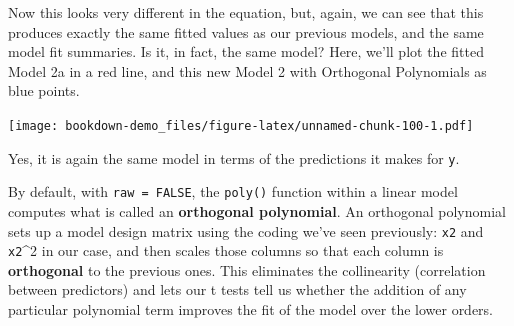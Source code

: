 \documentclass[]{book}
\newenvironment{Shaded}{\begin{snugshade}}{\end{snugshade}}
\newcommand{\KeywordTok}[1]{\textcolor[rgb]{0.13,0.29,0.53}{\textbf{#1}}}
\newcommand{\DataTypeTok}[1]{\textcolor[rgb]{0.13,0.29,0.53}{#1}}
\newcommand{\StringTok}[1]{\textcolor[rgb]{0.31,0.60,0.02}{#1}}
\newcommand{\OperatorTok}[1]{\textcolor[rgb]{0.81,0.36,0.00}{\textbf{#1}}}
\newcommand{\NormalTok}[1]{#1}
\theoremstyle{definition}
\theoremstyle{definition}
\theoremstyle{definition}
\theoremstyle{remark}
\begin{document}
Now this looks very different in the equation, but, again, we can see
that this produces exactly the same fitted values as our previous
models, and the same model fit summaries. Is it, in fact, the same
model? Here, we'll plot the fitted Model 2a in a red line, and this new
Model 2 with Orthogonal Polynomials as blue points.

\begin{Shaded}
\end{Shaded}

\texttt{[image: bookdown-demo\_files/figure-latex/unnamed-chunk-100-1.pdf]}

Yes, it is again the same model in terms of the predictions it makes for
\texttt{y}.

By default, with \texttt{raw\ =\ FALSE}, the \texttt{poly()} function
within a linear model computes what is called an \textbf{orthogonal
polynomial}. An orthogonal polynomial sets up a model design matrix
using the coding we've seen previously: \texttt{x2} and \texttt{x2}\^{}2
in our case, and then scales those columns so that each column is
\textbf{orthogonal} to the previous ones. This eliminates the
collinearity (correlation between predictors) and lets our t tests tell
us whether the addition of any particular polynomial term improves the
fit of the model over the lower orders.
\end{document}

